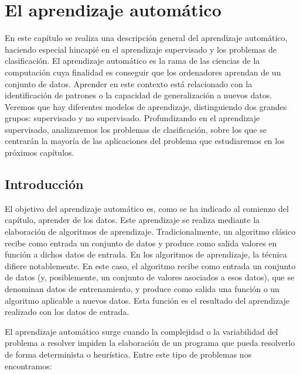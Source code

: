 \chapter{El aprendizaje automático}

En este capítulo se realiza una descripción general del aprendizaje automático, haciendo especial hincapié en el aprendizaje supervisado y los problemas de clasificación. El aprendizaje automático es la rama de las ciencias de la computación cuya finalidad es conseguir que los ordenadores aprendan de un conjunto de datos. Aprender en este contexto está relacionado con la identificación de patrones o la capacidad de generalización a nuevos datos. Veremos que hay diferentes modelos de aprendizaje, distinguiendo dos grandes grupos: supervisado y no supervisado. Profundizando en el aprendizaje supervisado, analizaremos los problemas de clasificación, sobre los que se centrarán la mayoría de las aplicaciones del problema que estudiaremos en los próximos capítulos.

\section{Introducción}

El objetivo del aprendizaje automático es, como se ha indicado al comienzo del capítulo, aprender de los datos. Este aprendizaje se realiza mediante la elaboración de algoritmos de aprendizaje. Tradicionalmente, un algoritmo clásico recibe como entrada un conjunto de datos y produce como salida valores en función a dichos datos de entrada. En los algoritmos de aprendizaje, la técnica difiere notablemente. En este caso, el algoritmo recibe como entrada un conjunto de datos (y, posiblemente, un conjunto de valores asociados a esos datos), que se denominan datos de entrenamiento, y produce como salida una función o un algoritmo aplicable a nuevos datos. Esta función es el resultado del aprendizaje realizado con los datos de entrada.

El aprendizaje automático surge cuando la complejidad o la variabilidad del problema a resolver impiden la elaboración de un programa que pueda resolverlo de forma determinista o heurística. Entre este tipo de problemas nos encontramos:

